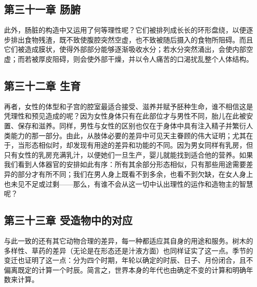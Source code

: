 
\subsection{第三十一章 肠腑}

此外，肠脏的构造中又运用了何等理性呢？它们被排列成长长的环形盘绕，以便逐步排出食物残渣，既不致使腹腔突然空虚，也不致被随后摄入的食物所阻碍。而且它们被造成膜状，使得外部部分能够逐渐吸收水分；若水分突然涌出，会使内部空虚；而若被厚皮阻碍，则会使外部干燥，并以令人痛苦的口渴扰乱整个人体结构。\par


\subsection{第三十二章 生育}

再者，女性的体型和子宫的腔室最适合接受、滋养并赋予胚种生命，谁不相信这是凭理性和预见造成的呢？因为女性身体只有在此部位才与男性不同，胎儿在此被安置、保存和滋养。同样，男性与女性的区别也仅在于身体中具有注入精子并繁衍人类能力的那一部分。由此，从肢体必要的差异中可见天主眷顾的伟大证明；尤其在于，当形态相似时，却发现有用途的差异和功能的不同。因为男女同样有乳房，但只有女性的乳房充满乳汁，以便她们一旦生产，婴儿就能找到适合他的营养。如果我们看到人体器官的安排如此有序：所有其余部分形态相似，只有那些用途需要差异的部分才有所不同；我们在男人身上既看不到多余，也看不到欠缺，在女人身上也未见不足或过剩——那么，有谁不会从这一切中认出理性的运作和造物主的智慧呢？\par


\subsection{第三十三章 受造物中的对应}

与此一致的还有其它动物合理的差异，每一种都适应其自身的用途和服务。树木的多样性、草药的差异（无论是在形态还是汁液方面）也同样证实了这一点。季节的变迁也证明了这一点：分为四个时期，年轮以确定的时辰、日子、月份闭合，且不偏离既定的计算一个时辰。简言之，世界本身的年代也由确定不变的计算和明确年数来计算。\par


